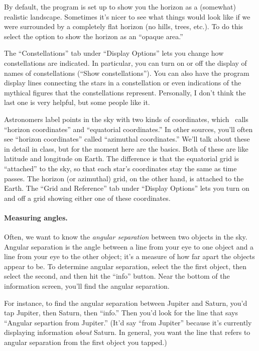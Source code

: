 By default, the program is set up to show you the horizon as a 
(somewhat) realistic landscape. Sometimes it's nicer to see what
things would look like if we were surrounded by a completely flat horizon
(no hills, trees, etc.). To do this select the option to show
the horizon as an ``opaque area.''

The ``Constellations'' tab under ``Display Options'' lets you
change how constellations are indicated.
In particular, you can turn on or off the display of names
of constellations (``Show constellations''). You can also have
the program display lines connecting the stars in a constellation or even
indications of the mythical figures that the constellations represent.
Personally, I don't think the last one is very helpful, but
some people like it.

Astronomers label points in the sky with two kinds of coordinates, 
which \skysaf\ calls ``horizon coordinates'' and ``equatorial coordinates.''
In other sources, you'll often see ``horizon coordinates'' called
``azimuthal coordinates.''
We'll talk about these in detail in class,
but for the moment here are the basics.
Both of these are like latitude and longitude on Earth. The
difference is that the equatorial grid is ``attached'' to the sky, so
that each star's coordinates stay the same as time passes.
The
horizon (or azimuthal)
grid, on the other hand, is attached to the Earth. 
The ``Grid and Reference'' tab under ``Display Options''
lets you turn on and off a grid showing either one of these coordinates.


\paragraph{Measuring angles.}
Often, we want to know the \textit{angular separation} between two
objects in the sky. Angular separation is the angle between a line from your eye
to one object and a line from your eye to the other object; it's a measure
of how far apart the objects appear to be. To determine
angular separation, select the the first object, then
select the second, and then hit the ``info'' button. Near
the bottom of the information screen, you'll find the angular separation.

For instance, to find the angular separation between Jupiter and Saturn,
you'd tap Jupiter, then Saturn, then ``info.'' Then you'd
look for the line that says
``Angular separtion from Jupiter.'' (It'd say ``from Jupiter''
because it's currently displaying information \textit{about}
Saturn. In general, you want the line that refers to 
angular separation from the first object you tapped.)

